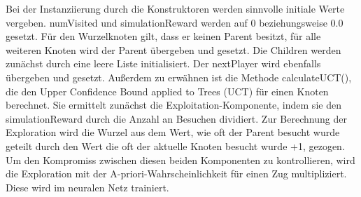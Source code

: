 \documentclass[12pt,a4paper]{article}
\begin{document}
Bei der Instanziierung durch die Konstruktoren werden sinnvolle initiale Werte vergeben. numVisited und simulationReward werden auf 0 beziehungsweise 0.0 gesetzt. Für den Wurzelknoten gilt, dass er keinen Parent besitzt, für alle weiteren Knoten wird der Parent übergeben und gesetzt. Die Children werden zunächst durch eine leere Liste initialisiert. Der nextPlayer wird ebenfalls übergeben und gesetzt. Außerdem zu erwähnen ist die Methode calculateUCT(), die den Upper Confidence Bound applied to Trees (UCT) für einen Knoten berechnet. Sie ermittelt zunächst die Exploitation-Komponente, indem sie den simulationReward durch die Anzahl an Besuchen dividiert. Zur Berechnung der Exploration wird die Wurzel aus dem Wert, wie oft der Parent besucht wurde geteilt durch den Wert die oft der aktuelle Knoten besucht wurde +1, gezogen. Um den Kompromiss zwischen diesen beiden Komponenten zu kontrollieren, wird die Exploration mit der A-priori-Wahrscheinlichkeit für einen Zug multipliziert. Diese wird im neuralen Netz trainiert.
\end{document}
